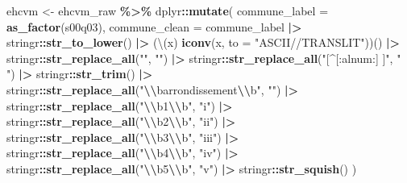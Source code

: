 \documentclass[
]{article}
\newenvironment{Shaded}{\begin{snugshade}}{\end{snugshade}}
\newcommand{\AttributeTok}[1]{\textcolor[rgb]{0.13,0.29,0.53}{#1}}
\newcommand{\FunctionTok}[1]{\textcolor[rgb]{0.13,0.29,0.53}{\textbf{#1}}}
\newcommand{\NormalTok}[1]{#1}
\newcommand{\OtherTok}[1]{\textcolor[rgb]{0.56,0.35,0.01}{#1}}
\newcommand{\SpecialCharTok}[1]{\textcolor[rgb]{0.81,0.36,0.00}{\textbf{#1}}}
\newcommand{\StringTok}[1]{\textcolor[rgb]{0.31,0.60,0.02}{#1}}
\begin{document}
\begin{Shaded}
\begin{Highlighting}[]
\NormalTok{ehcvm }\OtherTok{\textless{}{-}}\NormalTok{ ehcvm\_raw }\SpecialCharTok{\%\textgreater{}\%}
\NormalTok{  dplyr}\SpecialCharTok{::}\FunctionTok{mutate}\NormalTok{(}
    \AttributeTok{commune\_label =} \FunctionTok{as\_factor}\NormalTok{(s00q03),}
    \AttributeTok{commune\_clean =}\NormalTok{ commune\_label }\SpecialCharTok{|\textgreater{}}
\NormalTok{      stringr}\SpecialCharTok{::}\FunctionTok{str\_to\_lower}\NormalTok{() }\SpecialCharTok{|\textgreater{}}
\NormalTok{      (\textbackslash{}(x) }\FunctionTok{iconv}\NormalTok{(x, }\AttributeTok{to =} \StringTok{"ASCII//TRANSLIT"}\NormalTok{))() }\SpecialCharTok{|\textgreater{}}
\NormalTok{      stringr}\SpecialCharTok{::}\FunctionTok{str\_replace\_all}\NormalTok{(}\StringTok{"\textquotesingle{}"}\NormalTok{, }\StringTok{""}\NormalTok{) }\SpecialCharTok{|\textgreater{}}
\NormalTok{      stringr}\SpecialCharTok{::}\FunctionTok{str\_replace\_all}\NormalTok{(}\StringTok{"[\^{}[:alnum:] ]"}\NormalTok{, }\StringTok{" "}\NormalTok{) }\SpecialCharTok{|\textgreater{}}
\NormalTok{      stringr}\SpecialCharTok{::}\FunctionTok{str\_trim}\NormalTok{() }\SpecialCharTok{|\textgreater{}}
\NormalTok{      stringr}\SpecialCharTok{::}\FunctionTok{str\_replace\_all}\NormalTok{(}\StringTok{"}\SpecialCharTok{\textbackslash{}\textbackslash{}}\StringTok{barrondissement}\SpecialCharTok{\textbackslash{}\textbackslash{}}\StringTok{b"}\NormalTok{, }\StringTok{""}\NormalTok{) }\SpecialCharTok{|\textgreater{}}
\NormalTok{      stringr}\SpecialCharTok{::}\FunctionTok{str\_replace\_all}\NormalTok{(}\StringTok{"}\SpecialCharTok{\textbackslash{}\textbackslash{}}\StringTok{b1}\SpecialCharTok{\textbackslash{}\textbackslash{}}\StringTok{b"}\NormalTok{, }\StringTok{"i"}\NormalTok{) }\SpecialCharTok{|\textgreater{}}
\NormalTok{      stringr}\SpecialCharTok{::}\FunctionTok{str\_replace\_all}\NormalTok{(}\StringTok{"}\SpecialCharTok{\textbackslash{}\textbackslash{}}\StringTok{b2}\SpecialCharTok{\textbackslash{}\textbackslash{}}\StringTok{b"}\NormalTok{, }\StringTok{"ii"}\NormalTok{) }\SpecialCharTok{|\textgreater{}}
\NormalTok{      stringr}\SpecialCharTok{::}\FunctionTok{str\_replace\_all}\NormalTok{(}\StringTok{"}\SpecialCharTok{\textbackslash{}\textbackslash{}}\StringTok{b3}\SpecialCharTok{\textbackslash{}\textbackslash{}}\StringTok{b"}\NormalTok{, }\StringTok{"iii"}\NormalTok{) }\SpecialCharTok{|\textgreater{}}
\NormalTok{      stringr}\SpecialCharTok{::}\FunctionTok{str\_replace\_all}\NormalTok{(}\StringTok{"}\SpecialCharTok{\textbackslash{}\textbackslash{}}\StringTok{b4}\SpecialCharTok{\textbackslash{}\textbackslash{}}\StringTok{b"}\NormalTok{, }\StringTok{"iv"}\NormalTok{) }\SpecialCharTok{|\textgreater{}}
\NormalTok{      stringr}\SpecialCharTok{::}\FunctionTok{str\_replace\_all}\NormalTok{(}\StringTok{"}\SpecialCharTok{\textbackslash{}\textbackslash{}}\StringTok{b5}\SpecialCharTok{\textbackslash{}\textbackslash{}}\StringTok{b"}\NormalTok{, }\StringTok{"v"}\NormalTok{) }\SpecialCharTok{|\textgreater{}}
\NormalTok{      stringr}\SpecialCharTok{::}\FunctionTok{str\_squish}\NormalTok{()}
\NormalTok{  )}
\end{Highlighting}
\end{Shaded}
\end{document}
